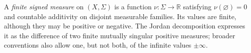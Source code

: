 
A \emph{finite signed measure} on $(X,\Sigma)$ is a function $\nu:\Sigma\to\mathbb R$ satisfying $\nu(\varnothing)=0$ and countable additivity on disjoint measurable families. Its values are finite, although they may be positive or negative. The Jordan decomposition expresses it as the difference of two finite mutually singular positive measures; broader conventions also allow one, but not both, of the infinite values $\pm\infty$.
